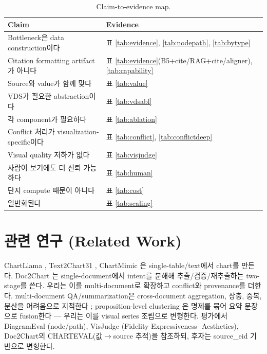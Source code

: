 \documentclass[11pt]{article}
\begin{document}
\begin{table}[h]
\centering\small
\begin{tabular}{p{6.2cm} p{6.5cm}}
\toprule
Claim & Evidence \\
\midrule
Bottleneck은 data construction이다 & 표 \ref{tab:evidence}, \ref{tab:nodepath}, \ref{tab:bytype} \\
Citation formatting artifact가 아니다 & 표 \ref{tab:evidence}(B5+cite/RAG+cite/aligner), \ref{tab:capability} \\
Source와 value가 함께 맞다 & 표 \ref{tab:value} \\
VDS가 필요한 abstraction이다 & 표 \ref{tab:vdsabl} \\
각 component가 필요하다 & 표 \ref{tab:ablation} \\
Conflict 처리가 visualization-specific이다 & 표 \ref{tab:conflict}, \ref{tab:conflictdeep} \\
Visual quality 저하가 없다 & 표 \ref{tab:visjudge} \\
사람이 보기에도 더 신뢰 가능하다 & 표 \ref{tab:human} \\
단지 compute 때문이 아니다 & 표 \ref{tab:cost} \\
일반화된다 & 표 \ref{tab:scaling} \\
\bottomrule
\end{tabular}
\caption{Claim-to-evidence map.}
\label{tab:claimmap}
\end{table}

\section{관련 연구 (Related Work)}
ChartLlama \cite{han2023chartllama}, Text2Chart31 \cite{zadeh2024text2chart31}, ChartMimic
\cite{yang2024chartmimic}은 single-table/text에서 chart를 만든다. Doc2Chart \cite{jain2025doc2chart}
는 single-document에서 intent를 분해해 추출/검증/재추출하는 two-stage를 쓴다. 우리는 이를
multi-document로 확장하고 conflict와 provenance를 더한다. multi-document QA/summarization은
cross-document aggregation, 상충, 중복, 분산을 어려움으로 지적한다 \cite{ernst2022proposition,
tang2024multihoprag}; proposition-level clustering \cite{ernst2022proposition}은 명제를 묶어 요약
문장으로 fusion한다 — 우리는 이를 visual series 조립으로 변형한다. 평가에서 DiagramEval
\cite{liang2025diagrameval}(node/path), VisJudge \cite{xie2025visjudge}(Fidelity-Expressiveness-
Aesthetics), Doc2Chart의 CHARTEVAL(값$\rightarrow$source 추적)을 참조하되, 후자는 source\_eid
기반으로 변형한다.
\end{document}
